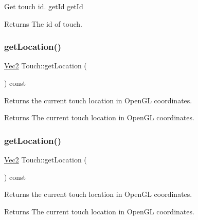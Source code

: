 Get touch id.  get\+Id  get\+Id

\begin{DoxyReturn}{Returns}
The id of touch. 
\end{DoxyReturn}
\mbox{\label{classTouch_af6895993796395892d88534943d7f683}} 
\subsubsection{\texorpdfstring{get\+Location()}{getLocation()}\hspace{0.1cm}{\footnotesize\ttfamily [1/2]}}
{\footnotesize\ttfamily \hyperlink{classVec2}{Vec2} Touch\+::get\+Location (\begin{DoxyParamCaption}{ }\end{DoxyParamCaption}) const}

Returns the current touch location in Open\+GL coordinates.

\begin{DoxyReturn}{Returns}
The current touch location in Open\+GL coordinates. 
\end{DoxyReturn}
\mbox{\label{classTouch_af6895993796395892d88534943d7f683}} 
\subsubsection{\texorpdfstring{get\+Location()}{getLocation()}\hspace{0.1cm}{\footnotesize\ttfamily [2/2]}}
{\footnotesize\ttfamily \hyperlink{classVec2}{Vec2} Touch\+::get\+Location (\begin{DoxyParamCaption}{ }\end{DoxyParamCaption}) const}

Returns the current touch location in Open\+GL coordinates.

\begin{DoxyReturn}{Returns}
The current touch location in Open\+GL coordinates. 
\end{DoxyReturn}
\mbox{\label{classTouch_aaf3ef147c02cc42da2926b85d314c351}} 
